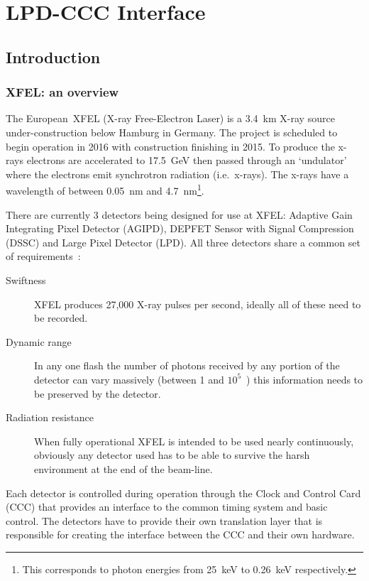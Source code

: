 \part{LPD-CCC Interface} %
\label{prt:lpd_ccc_interface}
\chapter{Introduction} %
\label{cha:lpd_ccc_introduction}
\section{XFEL: an overview} %
\label{sec:xfel_an_overview}
The European~XFEL (X-ray Free-Electron Laser) is a 3.4~km X-ray source under-construction below Hamburg in Germany. The project is scheduled to begin operation in 2016 with construction finishing in 2015. To produce the x-rays electrons are accelerated to 17.5~GeV then passed through an `undulator' where the electrons emit synchrotron radiation (i.e.\ x-rays). The x-rays have a wavelength of between 0.05~nm and 4.7~nm\footnote{This corresponds to photon energies from 25~keV to 0.26~keV respectively.}. 
    
There are currently 3 detectors being designed for use at XFEL: Adaptive Gain Integrating Pixel Detector (AGIPD), DEPFET Sensor with Signal Compression (DSSC) and Large Pixel Detector (LPD). All three detectors share a common set of requirements~\cite{xfel_website}:
\begin{description}
    \item[Swiftness] XFEL produces 27,000 X-ray pulses per second, ideally all of these need to be recorded.
    \item[Dynamic range] In any one flash the number of photons received by any portion of the detector can vary massively (between 1 and \(10^5\)~\cite{lpd_manual}) this information needs to be preserved by the detector.
    \item[Radiation resistance] When fully operational XFEL is intended to be used nearly continuously, obviously any detector used has to be able to survive the harsh environment at the end of the beam-line.
\end{description}
Each detector is controlled during operation through the Clock and Control Card (CCC) that provides an interface to the common timing system and basic control. The detectors have to provide their own translation layer that is responsible for creating the interface between the CCC and their own hardware. 

